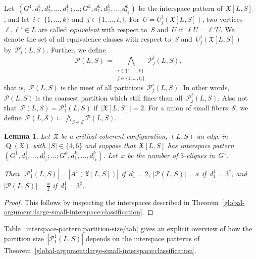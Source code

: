 \documentclass[english,a4paper]{article}
\theoremstyle{plain}
\newtheorem{lemma}      [theorem]{Lemma}
\theoremstyle{definition}
\newcommand{\abs}[1]{| #1 |}
\newcommand{\coherentConfig}{\ensuremath{\mathfrak{X}}}
\newcommand{\interspace}[2]{\ensuremath{\coherentConfig[#1,#2]}}
\DeclareMathOperator*{\Quotient}{Q}
\newcommand{\quotientGraph}[1]{\ensuremath{\Quotient(#1)}}
\newcommand{\partition}[1]{\ensuremath{\mathcal{P}^1_1(#1)}}
\newcommand{\partitionRel}[3]{\ensuremath{\mathcal{P}^{#1}_{#2}(#3)}}
\newcommand{\equivalenceClasses}[1]{\ensuremath{\mathcal{P}(#1)}}
\begin{document}
Let~$(G^1, d^1_1, d^1_2, \dots, d^1_{t_1}; \dots; G^k, d^k_1, d^k_2, \dots, d^k_{t_k})$ be the interspace pattern of~$\interspace{L}{S}$, and let~$i \in \{1,\ldots,k\}$ and~$j \in \{1,\ldots,t_i\}$.
For~$U = U^i_j(\interspace{L}{S})$, two vertices~$\ell, \ell' \in L$ are called \emph{equivalent} with respect to~$S$ and~$U$ if~$\ell U =\ell'U$.
We denote the set of all equivalence classes with respect to~$S$ and~$U^i_j(\interspace{L}{S})$ by~$\partitionRel{i}{j}{L,S}$.
Further, we define~
\[
    \equivalenceClasses{L,S} \coloneqq \bigwedge_{\substack{i \in \{1,\ldots,k\} \\ j \in \{1,\ldots,t_i\}}}  \partitionRel{i}{j}{L,S},
\]
that is,~$\equivalenceClasses{L,S}$ is  the meet of all partitions~$\partitionRel{i}{j}{L,S}$.
In other words,~$\equivalenceClasses{L,S}$ is the coarsest partition which still finer than all~$\partitionRel{i}{j}{L,S}$. Also not that~$\equivalenceClasses{L,S} = \partition{L,S}$ if~$|\interspace{L}{S}|=2$.
For a union of small fibers~$\mathcal{S}$, we define~$\equivalenceClasses{L,\mathcal{S}} \coloneqq \bigwedge_{S \in \mathcal{S}} \equivalenceClasses{L,S}$.


\begin{lemma}
\label{interspace-pattern:partition-size/lem}
    Let~$\coherentConfig$ be a critical coherent configuration, $(L,S)$ an edge in~$\quotientGraph{\coherentConfig}$ with~$|S|\in \{4,6\}$ and suppose that~$\interspace{L}{S}$ has interspace pattern~$(G^1, d^1_1, \dots, d^1_{t_1}; \dots; G^k, d^k_1, \dots, d^k_{t_k})$.
    Let~$x$ be the number of $3$-cliques in~$G^1$.

    Then~$\abs{\partition{L,S}} = \abs{A^1(\interspace{L}{S})}$ if~$d^1_1 = 2$, $\abs{\equivalenceClasses{L,S}} = x$ if~$d^1_1 = 3^\dag$, and~$\abs{\equivalenceClasses{L,S}} = \frac{x}{2}$ if~$d^1_1 = 3^\ddag$.
\end{lemma}
\begin{proof}
    This follows by inspecting the interspaces described in Theorem~\ref{global-argument:large-small-interspace:classification}.
\end{proof}


Table~\ref{interspace-pattern:partition-size/tab} gives an explicit overview of how the partition size~$\abs{\partition{L,S}}$ depends on the interspace patterns of Theorem~\ref{global-argument:large-small-interspace:classification}.
\end{document}
